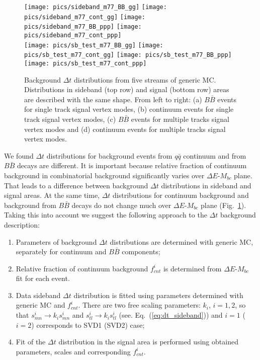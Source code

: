 \documentclass[preprint,aps,showpacs]{revtex4}
\newcommand{\dt}{\ensuremath{\Delta t}\xspace}
\newcommand{\bdpi}{\ensuremath{B^0\to \bar D^0\pi^0}\xspace}
\newcommand{\bdetagg}{\ensuremath{B^0\to \bar D^0\eta_{\gamma\gamma}}\xspace}
\newcommand{\bdetap}{\ensuremath{B^0\to \bar D^0\eta\prime}\xspace}
\newcommand{\bdetappp}{\ensuremath{B^0\to \bar D^0\eta_{\pi^+\pi^-\pi^0}}\xspace}
\newcommand{\bdomega}{\ensuremath{B^0\to \bar D^0\omega}\xspace}
\newcommand{\btodstpi}{\ensuremath{B^0\to \bar D^{*0}\pi^0}\xspace}
\newcommand{\btodsteta}{\ensuremath{B^0\to \bar D^{*0}\eta}\xspace}
\newcommand{\de}{\ensuremath{\Delta E}\xspace}
\newcommand{\mbc}{\ensuremath{M_{bc}}\xspace}
\begin{document}
\begin{figure}[htb]
 \texttt{[image: pics/sideband\_m77\_BB\_gg]}
 \texttt{[image: pics/sideband\_m77\_cont\_gg]}
 \texttt{[image: pics/sideband\_m77\_BB\_ppp]}
 \texttt{[image: pics/sideband\_m77\_cont\_ppp]}\\
 \texttt{[image: pics/sb\_test\_m77\_BB\_gg]}
 \texttt{[image: pics/sb\_test\_m77\_cont\_gg]}
 \texttt{[image: pics/sb\_test\_m77\_BB\_ppp]}
 \texttt{[image: pics/sb\_test\_m77\_cont\_ppp]}
\caption{Background \dt distributions from five streams of generic MC. Distributions in sideband (top row) and signal (bottom row) areas are described with the same shape. From left to right: (a) $B\bar B$ events for single track signal vertex modes, (b) continuum events for single track signal vertex modes, (c) $B\bar B$ events for multiple tracks signal vertex modes and (d) continuum events for multiple tracks signal vertex modes.}
\label{fig:GenMCSideband}
\end{figure}

We found \dt distributions for background events from $q\bar q$ continuum and from $B\bar B$ decays are different. It is important because relative fraction of continuum background in combinatorial background significantly varies over \de-\mbc plane. That leads to a difference between background \dt distributions in sideband and signal areas. At the same time, \dt distributions for continuum background and background from $B\bar B$ decays do not change much over \de-\mbc plane (Fig.~\ref{fig:GenMCSideband}). Taking this into account we suggest the following approach to the \dt background description:
\begin{enumerate}
 \item Parameters of background \dt distributions are determined with generic MC, separately for continuum and $B\bar B$ components;
 \item Relative fraction of continuum background $f_{cnt}^i$ is determined from \de-\mbc fit for each event.
 \item Data sideband \dt distribution is fitted using parameters determined with generic MC and $f_{cnt}^i$. There are two free scaling parameters: $k_i$, $i = 1,2$, so that $s^{i}_{mn}\to k_is^{i}_{mn}$ and $s^{i}_{tl}\to k_is^{i}_{tl}$ (see. Eq.~(\ref{eq:dt_sideband})) and $i = 1$ ($i=2$) corresponds to SVD1 (SVD2) case;
 \item Fit of the \dt distribution in the signal area is performed using obtained parameters, scales and corresponding $f_{cnt}^i$.
\end{enumerate}
\end{document}
